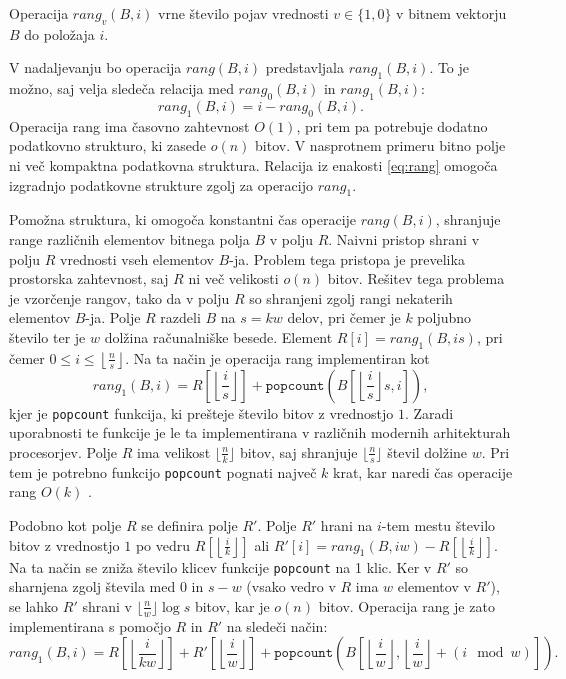 \begin{defi}
    Operacija $rang_v(B,i)$ vrne število pojav vrednosti $v\in\{1,0\}$ v bitnem vektorju $B$ do položaja $i$.
 \end{defi}
 
 V nadaljevanju bo operacija $rang(B,i)$ predstavljala $rang_1(B,i)$. To je možno, saj velja sledeča relacija med $rang_0(B,i)$ in $rang_1(B,i)$:
 \begin{equation}\label{eq:rang}
     rang_1(B,i)=i-rang_0(B,i).
 \end{equation}
  Operacija rang ima časovno zahtevnost $O(1)$, pri tem pa potrebuje dodatno podatkovno strukturo, ki zasede $o(n)$ bitov. V nasprotnem primeru bitno polje ni več kompaktna podatkovna struktura. Relacija iz enakosti \ref{eq:rang} omogoča izgradnjo podatkovne strukture zgolj za operacijo $rang_1$.
 
 Pomožna struktura, ki omogoča konstantni čas operacije $rang(B,i)$, shranjuje range različnih elementov bitnega polja $B$ v polju $R$. Naivni pristop shrani v polju $R$ vrednosti vseh elementov $B$-ja. Problem tega pristopa je prevelika prostorska zahtevnost, saj $R$ ni več velikosti $o(n)$ bitov. Rešitev tega problema je vzorčenje rangov, tako da v polju $R$ so shranjeni zgolj rangi nekaterih elementov $B$-ja. Polje $R$ razdeli $B$ na $s=kw$ delov, pri čemer je $k$ poljubno število ter je $w$ dolžina računalniške besede. Element $R[i]=rang_1(B,is)$, pri čemer $0\le i \le \left\lfloor\frac{n}{s} \right\rfloor$. Na ta način je operacija rang implementiran kot 
 \begin{equation}
     rang_1(B,i)=R\left[\left\lfloor\frac{i}{s} \right\rfloor\right] + \texttt{popcount}\left(B\left[\left\lfloor\frac{i}{s} \right\rfloor s,i\right]\right),
 \end{equation}
 kjer je \texttt{popcount} funkcija, ki prešteje število bitov z vrednostjo $1$. Zaradi uporabnosti te funkcije je le ta implementirana v različnih modernih arhitekturah procesorjev. Polje $R$ ima velikost $\lfloor\frac{n}{k}\rfloor$ bitov, saj shranjuje $\lfloor\frac{n}{s}\rfloor$ števil dolžine $w$. Pri tem je potrebno funkcijo \texttt{popcount} pognati največ $k$ krat, kar naredi čas operacije rang $O(k)$ \cite{Navarro2016}.
 
 Podobno kot polje $R$ se definira polje $R'$. Polje $R'$ hrani na $i$-tem mestu število bitov z vrednostjo $1$ po vedru $R[\left\lfloor\frac{i}{k} \right\rfloor]$ ali $R'[i]=rang_1(B,iw)-R[\left\lfloor\frac{i}{k} \right\rfloor]$. Na ta način se zniža število klicev funkcije \texttt{popcount} na 1 klic. Ker v $R'$ so sharnjena zgolj števila med 0 in $s-w$ (vsako vedro v $R$ ima $w$ elementov v $R'$), se lahko $R'$ shrani v $\lfloor\frac{n}{w}\rfloor\log{s}$ bitov, kar je $o(n)$ bitov. Operacija rang je zato implementirana s pomočjo $R$ in $R'$ na sledeči način:
 \begin{equation}
     rang_1(B,i)=R\left[\left\lfloor\frac{i}{kw} \right\rfloor\right]+ R'\left[\left\lfloor\frac{i}{w} \right\rfloor\right]+\texttt{popcount}\left(B\left[\left\lfloor\frac{i}{w} \right\rfloor,\left\lfloor\frac{i}{w} \right\rfloor+(i \mod w)\right]\right).
 \end{equation}
 
